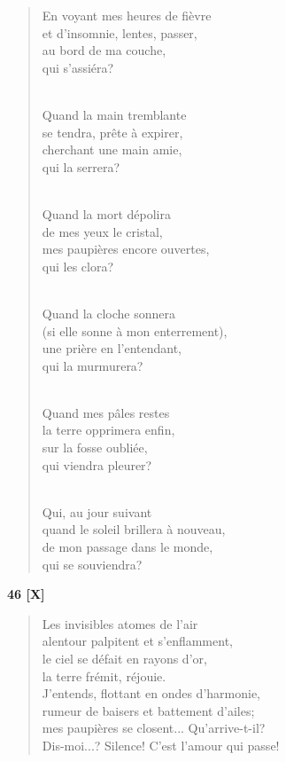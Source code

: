 \documentclass[a4paper,12pt]{book}
\begin{document}
\begin{verse}
En voyant mes heures de fièvre \\
et d'insomnie, lentes, passer, \\
au bord de ma couche, \\
qui s'assiéra? \\ \

Quand la main tremblante \\
se tendra, prête à expirer, \\
cherchant une main amie, \\
qui la serrera? \\ \


Quand la mort dépolira \\
de mes yeux le cristal, \\
mes paupières encore ouvertes, \\
qui les clora? \\ \

Quand la cloche sonnera \\
(si elle sonne à mon enterrement), \\
une prière en l'entendant, \\
qui la murmurera? \\ \

Quand mes pâles restes \\
la terre opprimera enfin, \\
sur la fosse oubliée, \\
qui viendra pleurer? \\ \

Qui, au jour suivant \\
quand le soleil brillera à nouveau, \\
de mon passage dans le monde, \\
qui se souviendra? \\
\end{verse}

\bigskip

\begin{center} {\bf 46 [X]} \end{center}

\begin{verse}
Les invisibles atomes de l'air \\
alentour palpitent et s'enflamment, \\
le ciel se défait en rayons d'or, \\
la terre frémit, réjouie. \\
J'entends, flottant en ondes d'harmonie, \\
rumeur de baisers et battement d'ailes; \\
mes paupières se closent... Qu'arrive-t-il? \\
Dis-moi...? Silence! C'est l'amour qui passe! \\
\end{verse}
\end{document}
